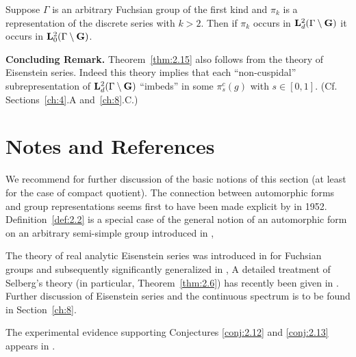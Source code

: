 \begin{theorem}\label{thm:2.15}

Suppose $\Gamma$ is an arbitrary Fuchsian group of the first kind and $\pi_k$ is a representation of the discrete series with $k > 2$. Then if $\pi_k$ occurs in $\mathbf{L}_d^2(\Gamma \setminus \mathbf{G})$ it occurs in $\mathbf{L}_0^2(\Gamma \setminus \mathbf{G})$.

\end{theorem}

\textbf{Concluding Remark.} Theorem~\ref{thm:2.15} also follows from the theory of Eisenstein series. Indeed this theory implies that each ``non-cuspidal'' subrepresentation of $\mathbf{L}_d^2(\Gamma \setminus \mathbf{G})$ ``imbeds'' in some $\pi_s^{c}(g)$ with $s \in [0,1]$. (Cf. Sections~\ref{ch:4}.A and~\ref{ch:8}.C.)

\section*{Notes and References}


We recommend \cite{GelfandGraevPyatetskiiShapiro} for further discussion of the basic notions of this section (at least for the case of compact quotient). The connection between automorphic forms and group representations seems first to have been made explicit by \cite{GelfandFomin} in 1952. Definition~\ref{def:2.2} is a special case of the general notion of an automorphic form on an arbitrary semi-simple group introduced in \cite{HarishChandra},

The theory of real analytic Eisenstein series was introduced in \cite{Selberg} for Fuchsian groups and subsequently significantly generalized in \cite{Langlands}, A detailed treatment of Selberg's theory (in particular, Theorem~\ref{thm:2.6}) has recently been given in \cite{Kubota}. Further discussion of Eisenstein series and the continuous spectrum is to be found in Section~\ref{ch:8}.

The experimental evidence supporting Conjectures \ref{conj:2.12} and \ref{conj:2.13} appears in \cite{Cartier}.
